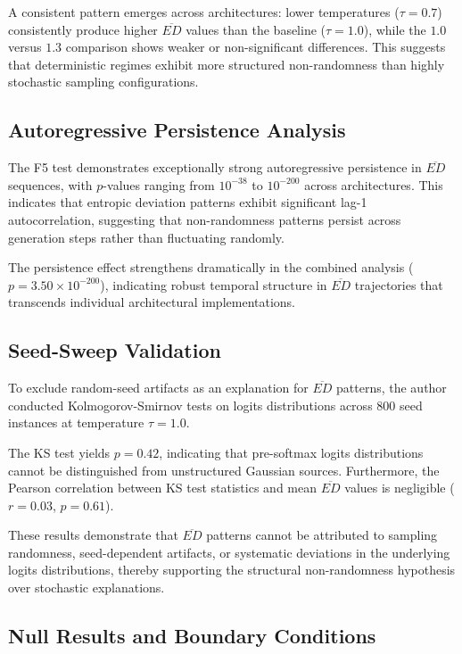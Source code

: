 \documentclass[12pt]{article}
\begin{document}
A consistent pattern emerges across architectures: lower temperatures ($\tau = 0.7$) consistently produce higher $\overline{ED}$ values than the baseline ($\tau = 1.0$), while the $1.0$ versus $1.3$ comparison shows weaker or non-significant differences. This suggests that deterministic regimes exhibit more structured non-randomness than highly stochastic sampling configurations.

\subsection{Autoregressive Persistence Analysis}

The F5 test demonstrates exceptionally strong autoregressive persistence in $\overline{ED}$ sequences, with $p$-values ranging from $10^{-38}$ to $10^{-200}$ across architectures. This indicates that entropic deviation patterns exhibit significant lag-1 autocorrelation, suggesting that non-randomness patterns persist across generation steps rather than fluctuating randomly.

The persistence effect strengthens dramatically in the combined analysis ($p = 3.50 \times 10^{-200}$), indicating robust temporal structure in $\overline{ED}$ trajectories that transcends individual architectural implementations.

\subsection{Seed-Sweep Validation}\label{sec:seed_sweep}

To exclude random-seed artifacts as an explanation for $\overline{ED}$ patterns, the author conducted Kolmogorov-Smirnov tests on logits distributions across 800 seed instances at temperature $\tau = 1.0$.

The KS test yields $p = 0.42$, indicating that pre-softmax logits distributions cannot be distinguished from unstructured Gaussian sources. Furthermore, the Pearson correlation between KS test statistics and mean $\overline{ED}$ values is negligible ($r = 0.03$, $p = 0.61$).

These results demonstrate that $\overline{ED}$ patterns cannot be attributed to sampling randomness, seed-dependent artifacts, or systematic deviations in the underlying logits distributions, thereby supporting the structural non-randomness hypothesis over stochastic explanations.

\subsection{Null Results and Boundary Conditions}
\end{document}
